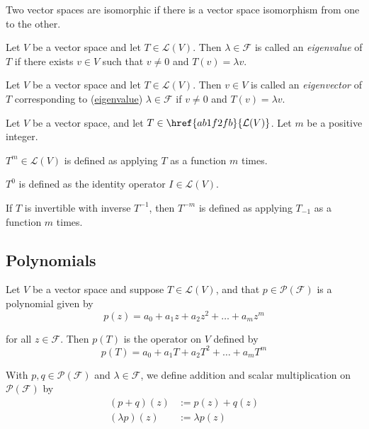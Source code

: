 Two vector spaces are isomorphic if there is a vector space isomorphism from
one to the other.

\label{e174ec3}

Let $V$ be a vector space and let $T\in\mathcal L(V)$. Then $\lambda\in\mathcal
F$ is called an \textit{eigenvalue} of $T$ if there exists $v\in V$ such that
$v\neq0$ and $T(v)=\lambda v$.

\label{ac14802}

Let $V$ be a vector space and let $T\in\mathcal L(V)$. Then $v\in V$ is called
an \textit{eigenvector} of $T$ corresponding to (\href{e174ec3}{eigenvalue})
$\lambda\in\mathcal F$ if $v\neq0$ and $T(v)=\lambda v$.

\label{e4cc199}

Let $V$ be a vector space, and let $T\in\href{ab1f2fb}{\mathcal L(V)}$. Let $m$
be a positive integer.
\begin{enumerati}
  \item $T^m\in\mathcal L(V)$ is defined as applying $T$ as a function $m$ times.
  \item $T^0$ is defined as the identity operator $I\in\mathcal L(V)$.
  \item If $T$ is invertible with inverse $T^{-1}$, then $T^{-m}$ is defined as
        applying $T_{-1}$ as a function $m$ times.
\end{enumerati}

\subsection{Polynomials}\label{baa2513}

\label{df84c07}

Let $V$ be a vector space and suppose $T\in\mathcal L(V)$, and that
$p\in\mathcal P(\mathcal F)$ is a polynomial given by
$$
  p(z)=a_0+a_1z+a_2z^2+\ldots+a_mz^m
$$

for all $z\in\mathcal F$. Then $p(T)$ is the operator on $V$ defined by
$$
  p(T)=a_0+a_1T+a_2T^2+\ldots+a_mT^m
$$

With $p,q\in\mathcal P(\mathcal F)$ and $\lambda\in\mathcal F$, we define
addition and scalar multiplication on $\mathcal P(\mathcal F)$ by
\begin{align*}
  (p+q)(z)       &:=p(z)+q(z)    \\
  (\lambda p)(z) &:=\lambda p(z)
\end{align*}

